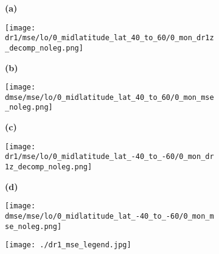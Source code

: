 \documentclass[preview]{standalone}
\begin{document}
\begin{figure}
  \begin{subfigure}[t]{0.05\textwidth}
    \textbf{\large{(a)}}
  \end{subfigure}
  \begin{subfigure}[t]{0.45\textwidth}
    \texttt{[image: dr1/mse/lo/0\_midlatitude\_lat\_40\_to\_60/0\_mon\_dr1z\_decomp\_noleg.png]}
  \end{subfigure}
  \begin{subfigure}[t]{0.05\textwidth}
    \textbf{\large{(b)}}
  \end{subfigure}
  \begin{subfigure}[t]{0.45\textwidth}
    \texttt{[image: dmse/mse/lo/0\_midlatitude\_lat\_40\_to\_60/0\_mon\_mse\_noleg.png]}
  \end{subfigure}

  \begin{subfigure}[t]{0.05\textwidth}
    \textbf{\large{(c)}}
  \end{subfigure}
  \begin{subfigure}[t]{0.45\textwidth}
    \texttt{[image: dr1/mse/lo/0\_midlatitude\_lat\_-40\_to\_-60/0\_mon\_dr1z\_decomp\_noleg.png]}
  \end{subfigure}
  \begin{subfigure}[t]{0.05\textwidth}
    \textbf{\large{(d)}}
  \end{subfigure}
  \begin{subfigure}[t]{0.45\textwidth}
    \texttt{[image: dmse/mse/lo/0\_midlatitude\_lat\_-40\_to\_-60/0\_mon\_mse\_noleg.png]}
  \end{subfigure}

  \begin{subfigure}[t]{\textwidth}
    \texttt{[image: ./dr1\_mse\_legend.jpg]}
  \end{subfigure}

\end{figure}
\end{document}
